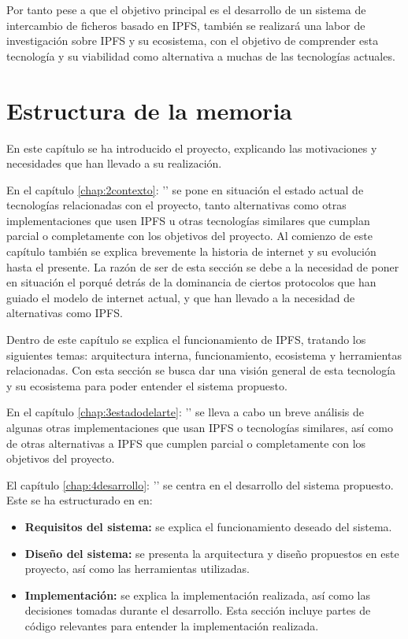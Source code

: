 Por tanto pese a que el objetivo principal es el desarrollo de un sistema de intercambio de ficheros basado en IPFS,
también se realizará una labor de investigación sobre  IPFS y su ecosistema, con el objetivo de comprender esta
tecnología y su viabilidad como alternativa a muchas de las tecnologías actuales.


\section{Estructura de la memoria}
En este capítulo se ha introducido el proyecto, explicando las motivaciones y necesidades que han llevado a su realización.

En el capítulo \ref{chap:2contexto}: '' se pone en situación el estado actual de tecnologías relacionadas con el proyecto, tanto alternativas
como otras implementaciones que usen IPFS u otras tecnologías similares que cumplan parcial o completamente con los objetivos del proyecto.
Al comienzo de este capítulo también se explica brevemente la historia de internet y su evolución hasta el presente.
La razón de ser de esta sección se debe a la necesidad de poner en situación el porqué detrás de la dominancia de ciertos
protocolos que han guiado el modelo de internet actual, y que han llevado a la necesidad de alternativas como IPFS.

Dentro de este capítulo se explica el funcionamiento de IPFS, tratando los siguientes temas: arquitectura interna, funcionamiento,
ecosistema y herramientas relacionadas. Con esta sección se busca dar una visión general de esta tecnología y su ecosistema para
poder entender el sistema propuesto.

En el capítulo \ref{chap:3estadodelarte}: '' se lleva a cabo un breve análisis
de algunas otras implementaciones que usan IPFS o tecnologías similares, así como de otras alternativas a IPFS que cumplen
parcial o completamente con los objetivos del proyecto.

El capítulo \ref{chap:4desarrollo}: '' se centra en el desarrollo del sistema propuesto. Este se ha estructurado en en:
\begin{itemize}
      \item \textbf{Requisitos del sistema:} se explica el funcionamiento deseado del sistema.
      \item \textbf{Diseño del sistema:} se presenta la arquitectura y diseño propuestos en este proyecto, así como las herramientas utilizadas.
      \item \textbf{Implementación:} se explica la implementación realizada, así como las decisiones tomadas durante el desarrollo. Esta sección
            incluye partes de código relevantes para entender la implementación realizada.
\end{itemize}

